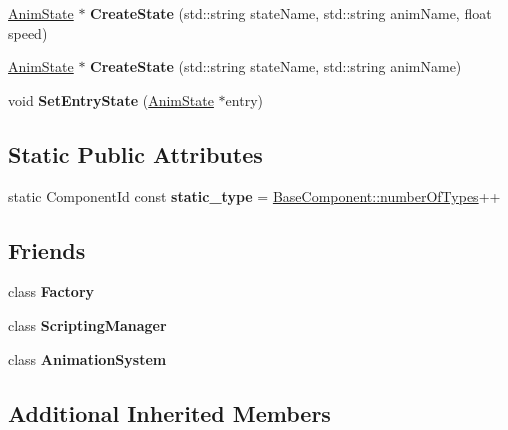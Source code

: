 \begin{DoxyCompactItemize}
\hyperlink{structAnimState}{Anim\+State} $\ast$ {\bfseries Create\+State} (std\+::string state\+Name, std\+::string anim\+Name, float speed)
\item 
\mbox{\label{classAnimationComponent_ad19e6c6a3b266d7987391be6d3ece4ea}} 
\hyperlink{structAnimState}{Anim\+State} $\ast$ {\bfseries Create\+State} (std\+::string state\+Name, std\+::string anim\+Name)
\item 
\mbox{\label{classAnimationComponent_ae63c07831f76d1c69a8be6dbd03f54a2}} 
void {\bfseries Set\+Entry\+State} (\hyperlink{structAnimState}{Anim\+State} $\ast$entry)
\end{DoxyCompactItemize}
\subsection*{Static Public Attributes}
\begin{DoxyCompactItemize}
\item 
\mbox{\label{classAnimationComponent_afd0771d0bf533c347cb80f0343ec747b}} 
static Component\+Id const {\bfseries static\+\_\+type} = \hyperlink{classBaseComponent_a084ade347bc71a7f0d3b17ecdc2225a4}{Base\+Component\+::number\+Of\+Types}++
\end{DoxyCompactItemize}
\subsection*{Friends}
\begin{DoxyCompactItemize}
\item 
\mbox{\label{classAnimationComponent_a328c093d609680cca505905c6d49901a}} 
class {\bfseries Factory}
\item 
\mbox{\label{classAnimationComponent_ab3d6fafb2064bace492fd6b503d044f4}} 
class {\bfseries Scripting\+Manager}
\item 
\mbox{\label{classAnimationComponent_a4c8fb761c777f1a874c5d97e052686ad}} 
class {\bfseries Animation\+System}
\end{DoxyCompactItemize}
\subsection*{Additional Inherited Members}


